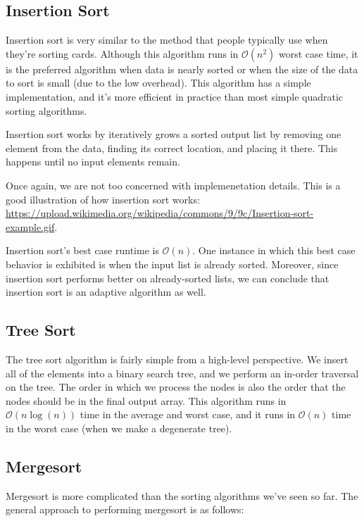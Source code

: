 \subsection{Insertion Sort}

Insertion sort is very similar to the method that people typically use when they're sorting cards. Although this algorithm runs in $\mathcal{O}(n^2)$ worst case time, it is the preferred algorithm when data is nearly sorted or when the size of the data to sort is small (due to the low overhead). This algorithm has a simple implementation, and it's more efficient in practice than most simple quadratic sorting algorithms. 

Insertion sort works by iteratively grows a sorted output list by removing one element from the data, finding its correct location, and placing it there. This happens until no input elements remain. 

Once again, we are not too concerned with implemenetation details. This is a good illustration of how insertion sort works:  \url{https://upload.wikimedia.org/wikipedia/commons/9/9c/Insertion-sort-example.gif}.

Insertion sort's best case runtime is $\mathcal{O}(n)$. One instance in which this best case behavior is exhibited is when the input list is already sorted. Moreover, since insertion sort performs better on already-sorted lists, we can conclude that insertion sort is an adaptive algorithm as well.


\subsection{Tree Sort}

The tree sort algorithm is fairly simple from a high-level perspective. We insert all of the elements into a binary search tree, and we perform an in-order traversal on the tree. The order in which we process the nodes is also the order that the nodes should be in the final output array. This algorithm runs in $\mathcal{O}(n\log(n))$ time in the average and worst case, and it runs in $\mathcal{O}(n)$ time in the worst case (when we make a degenerate tree).

\subsection{Mergesort}

Mergesort is more complicated than the sorting algorithms we've seen so far. The general approach to performing mergesort is as follows:

